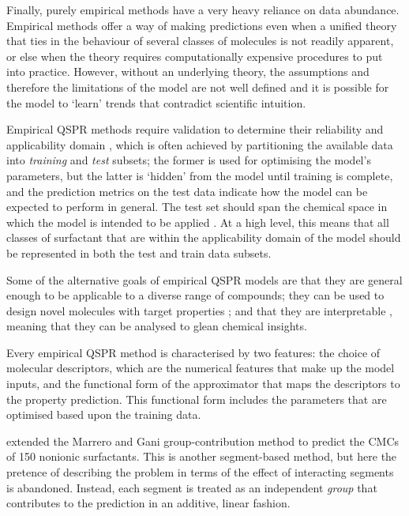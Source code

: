 Finally, purely empirical methods have a very heavy reliance on data abundance.
Empirical methods offer a way of making predictions even when a unified theory
that ties in the behaviour of several classes of molecules is not readily
apparent, or else when the theory requires computationally expensive procedures
to put into practice. However, without an underlying theory, the assumptions and
therefore the limitations of the model are not well defined and it is possible
for the model to `learn' trends that contradict scientific intuition.

Empirical QSPR methods require validation to determine their reliability and
applicability domain
\cite{veerasamyValidationQSARModelsstrategies2011,tropshaBestPracticesQSAR2010,leonardSelectionTrainingTest2006},
which is often achieved by partitioning the available data into \emph{training}
and \emph{test} subsets; the former is used for optimising the model's
parameters, but the latter is `hidden' from the model until training is
complete, and the prediction metrics on the test data indicate how the model can
be expected to perform in general. The test set should span the chemical space
in which the model is intended to be applied
\cite{leonardSelectionTrainingTest2006}. At a high level, this means that all
classes of surfactant that are within the applicability domain of the model
should be represented in both the test and train data subsets.

Some of the alternative goals of empirical QSPR models are that they are general
enough to be applicable to a diverse range of compounds; they can be used to
design novel molecules with target properties
\cite{gantzerInverseQSPRNovoDesign2020,bolboacaMolecularDesignQSARs2013}; and
that they are interpretable \cite{zefirovFragmentalApproachQSPR2002}, meaning
that they can be analysed to glean chemical insights.

Every empirical QSPR method is characterised by two features: the choice of
molecular descriptors, which are the numerical features that make up the model
inputs, and the functional form of the approximator that maps the descriptors to
the property prediction. This functional form includes the parameters that are
optimised based upon the training data.

\citet{matteiModelingCriticalMicelle2013} extended the Marrero and Gani
group-contribution method \cite{ganiAutomaticCreationMissing2005} to predict the
CMCs of 150 nonionic surfactants. This is another segment-based method, but here
the pretence of describing the problem in terms of the effect of interacting
segments is abandoned. Instead, each segment is treated as an independent
\emph{group} that contributes to the prediction in an additive, linear fashion.

